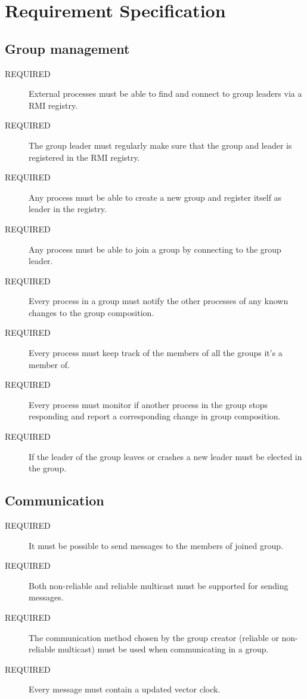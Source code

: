 \documentclass[english]{article}
\begin{document}
\section{Requirement Specification}

\subsection{Group management}
\begin{description}
\item[REQUIRED] External processes must be able to find and connect to group leaders via a RMI registry.

\item[REQUIRED] The group leader must regularly make sure that the group and leader is registered in the RMI registry.

\item[REQUIRED] Any process must be able to create a new group and register itself as leader in the registry.

\item[REQUIRED] Any process must be able to join a group by connecting to the group leader.

\item[REQUIRED] Every process in a group must notify the other processes of any known changes to the group composition.

\item[REQUIRED] Every process must keep track of the members of all the groups it's a member of.

\item[REQUIRED] Every process must monitor if another process in the group stops responding and report a corresponding change in group composition.

\item[REQUIRED] If the leader of the group leaves or crashes a new leader must be elected in the group.
\end{description}


\subsection{Communication}
\begin{description}
\item[REQUIRED] It must be possible to send messages to the members of joined group.

\item[REQUIRED] Both non-reliable and reliable multicast must be supported for sending messages.

\item[REQUIRED] The communication method chosen by the group creator (reliable or non-reliable multicast) must be used when communicating in a group.

\item[REQUIRED] Every message must contain a updated vector clock.
\end{description}
\end{document}
